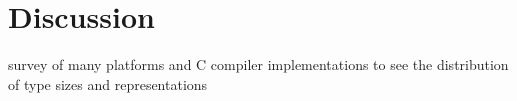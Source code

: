 \section{Discussion}

survey of many platforms and C compiler implementations to see the distribution of type sizes and representations
